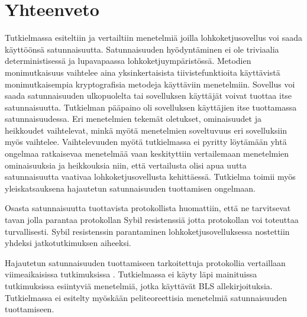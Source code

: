\chapter{Yhteenveto\label{conclusions}}

Tutkielmassa esiteltiin ja vertailtiin menetelmiä joilla lohkoketjusovellus voi saada käyttöönsä satunnaisuutta. Satunnaisuuden hyödyntäminen ei ole triviaalia deterministisessä ja lupavapaassa lohkoketjuympäristössä. Metodien monimutkaisuus vaihtelee aina yksinkertaisista tiivistefunktioita käyttävistä monimutkaisempia kryptografisia metodeja käyttäviin menetelmiin. Sovellus voi saada satunnaisuuden ulkopuolelta tai sovelluksen käyttäjät voivat tuottaa itse satunnaisuutta. Tutkielman pääpaino oli sovelluksen käyttäjien itse tuottamassa satunnaisuudessa. Eri menetelmien tekemät oletukset, ominaisuudet ja heikkoudet vaihtelevat, minkä myötä menetelmien soveltuvuus eri sovelluksiin myös vaihtelee. Vaihtelevuuden myötä tutkielmassa ei pyritty löytämään yhtä ongelmaa ratkaisevaa menetelmää vaan keskityttiin vertailemaan menetelmien ominaisuuksia ja heikkouksia niin, että vertailusta olisi apua uutta satunnaisuutta vaativaa lohkoketjusovellusta kehittäessä. Tutkielma toimii myös yleiskatsauksena hajautetun satunnaisuuden tuottamisen ongelmaan.

Osasta satunnaisuutta tuottavista protokollista huomattiin, että ne tarvitsevat tavan jolla parantaa protokollan Sybil resistenssiä jotta protokollan voi toteuttaa turvallisesti. Sybil resistenssin parantaminen lohkoketjusovelluksessa nostettiin yhdeksi jatkotutkimuksen aiheeksi.

Hajautetun satunnaisuuden tuottamiseen tarkoitettuja protokollia vertaillaan viimeaikaisissa tutkimuksissa \cite{bhat2021randpiper, bhat2022optrand, schindler_hydrand_2020}. Tutkielmassa ei käyty läpi mainituissa tutkimuksissa esiintyviä menetelmiä, jotka käyttävät BLS \cite{boneh2001short} allekirjoituksia. Tutkielmassa ei esitelty myöskään peliteoreettisia menetelmiä satunnaisuuden tuottamiseen.